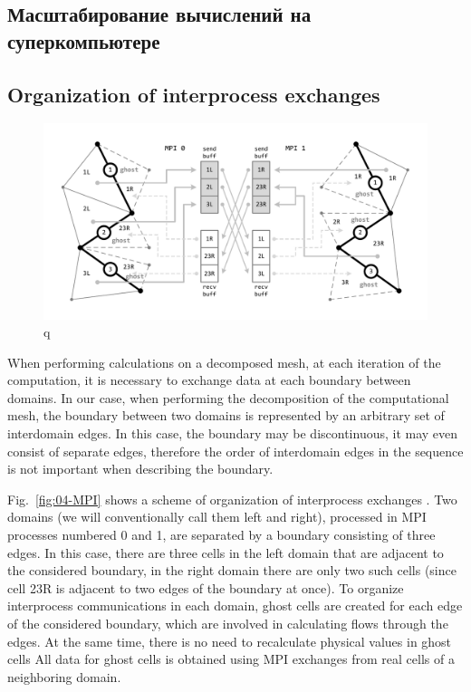 \subsection{Масштабирование вычислений на суперкомпьютере}

\subsection{Organization of interprocess exchanges}

\begin{figure}[ht]
\centering
\includegraphics[width=1.0\textwidth]{pics/text_2_scaling/mpi.pdf}
\caption{q}\label{fig:pic_classical_methods_multilayer}
\end{figure}

When performing calculations on a decomposed mesh, at each iteration of the computation, it is necessary to exchange data at each boundary between domains.
In our case, when performing the decomposition of the computational mesh, the boundary between two domains is represented by an arbitrary set of interdomain edges.
In this case, the boundary may be discontinuous, it may even consist of separate edges, therefore the order of interdomain edges in the sequence is not important when describing the boundary.

Fig.~\ref{fig:04-MPI} shows a scheme of organization of interprocess exchanges \cite{Rybakov_InnerRepresentation}.
Two domains (we will conventionally call them left and right), processed in MPI processes numbered 0 and 1, are separated by a boundary consisting of three edges.
In this case, there are three cells in the left domain that are adjacent to the considered boundary, in the right domain there are only two such cells (since cell 23R is adjacent to two edges of the boundary at once).
To organize interprocess communications in each domain, ghost cells are created for each edge of the considered boundary, which are involved in calculating flows through the edges.
At the same time, there is no need to recalculate physical values in ghost cells
All data for ghost cells is obtained using MPI exchanges from real cells of a neighboring domain.

